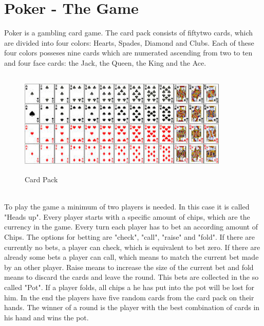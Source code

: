 \documentclass[12pt,fleqn,a4paper]{article}
\begin{document}
\section{Poker - The Game}
Poker is a gambling card game. The card pack consists of fiftytwo cards, which are divided into four colors: Hearts, Spades, Diamond and Clubs. Each of these four colors posseses nine cards which are numerated ascending from two to ten and four face cards: the Jack, the Queen, the King and the Ace.
\begin{figure}[!h]
	\begin{center}
		\includegraphics[width=10cm, height=5cm]{cards.jpg}
		\caption{Card Pack}
	\end{center}
\end{figure}
\\
To play the game a minimum of two players is needed. In this case it is called "Heads up". Every player starts with a specific amount of chips, which are the currency in the game. Every turn each player has to bet an according amount of Chips. The options for betting are "check", "call", "raise" and "fold". If there are currently no bets, a player can check, which is equivalent to bet zero. If there are already some bets a player can call, which means to match the current bet made by an other player. Raise means to increase the size of the current bet and fold means to discard the cards and leave the round. This bets are collected in the so called "Pot". If a player folds, all chips a he has put into the pot will be lost for him. In the end the players have five random cards from the card pack on their hands. The winner of a round is the player with the best combination of cards in his hand and wins the pot.
\end{document}
